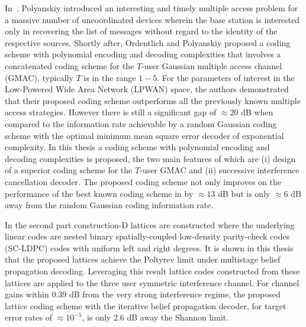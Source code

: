 	\indent In~\cite{polyanskiy2017perspective}, Polyanskiy introduced an interesting and timely multiple access problem for a massive number of uncoordinated devices wherein the base station is interested only in recovering the list of messages without regard to the identity of the respective sources. Shortly after, Ordentlich and Polyanskiy \cite{ordentlich2017low} proposed a coding scheme with polynomial encoding and decoding complexities that involves a concatenated coding scheme for the $T$-user Gaussian multiple access channel (GMAC), typically $T$ is in the range $1-5$. For the parameters of interest in the Low-Powered Wide Area Network (LPWAN) space, the authors \cite{ordentlich2017low} demonstrated that their proposed coding scheme outperforms all the previously known multiple access strategies. However there is still a significant gap of $\approx 20$ dB when compared to the information rate achievable by a random Gaussian coding scheme with the optimal minimum mean square error decoder of exponential complexity. In this thesis a coding scheme with polynomial encoding and decoding complexities is proposed, the two main features of which are (i) design of a superior coding scheme for the $T$-user GMAC and (ii) successive interference cancellation decoder. The proposed coding scheme not only improves on the performance of the best known coding scheme in \cite{ordentlich2017low} by $\approx 13$ dB but is only $\approx 6$ dB away from the random Gaussian coding information rate.

\indent In the second part construction-D lattices are constructed where the underlying linear codes are nested binary spatially-coupled low-density parity-check codes (SC-LDPC) codes with uniform left and right degrees. 
It is shown in this thesis that the proposed lattices achieve the Poltyrev limit under multistage belief propagation decoding. Leveraging this result lattice codes constructed from these lattices are applied to the three user symmetric interference channel. For channel gains within 0.39 dB from the very strong interference regime, the proposed lattice coding scheme with the iterative belief propagation decoder, for target error rates of $\approx 10^{-5}$, is only $2.6$ dB away the Shannon limit.

